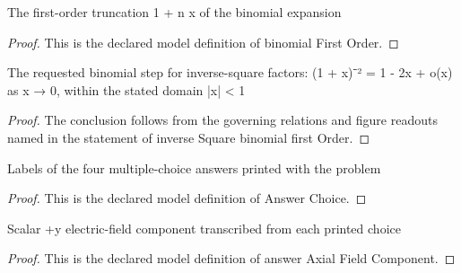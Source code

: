 \begin{definition}
  \label{def:physics:phyx-mini-0997:phyxminiproblems-problemphyxmini0997-binomialfirstorder}
  The first-order truncation 1 + n x of the binomial expansion
\end{definition}
\begin{proof}
  This is the declared model definition of binomial First Order.
\end{proof}
\begin{theorem}
  \label{thm:physics:phyx-mini-0997:phyxminiproblems-problemphyxmini0997-inversesquare-binomial-firstorder}
  The requested binomial step for inverse-square factors: (1 + x)⁻² = 1 - 2x + o(x) as x → 0, within the stated domain |x| < 1
\end{theorem}
\begin{proof}
  The conclusion follows from the governing relations and figure readouts named in the statement of inverse Square binomial first Order.
\end{proof}
\begin{definition}
  \label{def:physics:phyx-mini-0997:phyxminiproblems-problemphyxmini0997-answerchoice}
  Labels of the four multiple-choice answers printed with the problem
\end{definition}
\begin{proof}
  This is the declared model definition of Answer Choice.
\end{proof}
\begin{definition}
  \label{def:physics:phyx-mini-0997:phyxminiproblems-problemphyxmini0997-answeraxialfieldcomponent}
  Scalar +y electric-field component transcribed from each printed choice
\end{definition}
\begin{proof}
  This is the declared model definition of answer Axial Field Component.
\end{proof}
